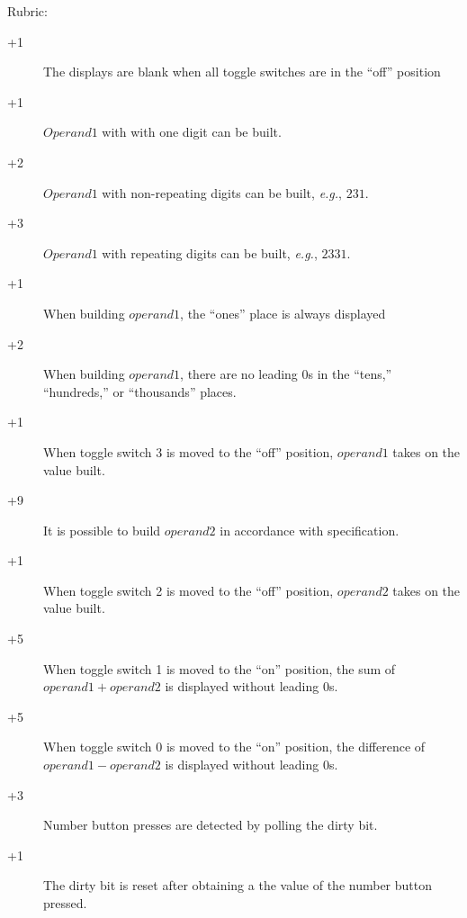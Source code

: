 \documentclass[12pt]{article}
\begin{document}
Rubric:
\begin{description}
    \item[\underline{\hspace{1cm}} +1] The displays are blank when all toggle
        switches are in the ``off'' position
    \item[\underline{\hspace{1cm}} +1] $Operand1$ with with one digit can be
        built.
    \item[\underline{\hspace{1cm}} +2] $Operand1$ with non-repeating digits can
        be built, \textit{e.g.}, $231$.
    \item[\underline{\hspace{1cm}} +3] $Operand1$ with repeating digits can be
        built, \textit{e.g.}, $2331$.
    \item[\underline{\hspace{1cm}} +1] When building $operand1$, the
        ``ones'' place is always displayed
    \item[\underline{\hspace{1cm}} +2] When building $operand1$,
        there are no leading $0$s in the ``tens,'' ``hundreds,'' or
        ``thousands'' places.
    \item[\underline{\hspace{1cm}} +1] When toggle switch 3 is moved to the
        ``off'' position, $operand1$ takes on the value built.
    \item[\underline{\hspace{1cm}} +9] It is possible to build $operand2$ in
        accordance with specification.
    \item[\underline{\hspace{1cm}} +1] When toggle switch 2 is moved to the
        ``off'' position, $operand2$ takes on the value built.
    \item[\underline{\hspace{1cm}} +5] When toggle switch 1 is moved to the
        ``on'' position, the sum of $operand1 + operand2$ is displayed without
        leading $0$s.
    \item[\underline{\hspace{1cm}} +5] When toggle switch 0 is moved to the
        ``on'' position, the difference of $operand1 - operand2$ is displayed
        without leading $0$s.
    \item[\underline{\hspace{1cm}} +3] Number button presses are detected by
        polling the dirty bit.
    \item[\underline{\hspace{1cm}} +1] The dirty bit is reset after obtaining a
        the value of the number button pressed.
\end{description}
\end{document}
